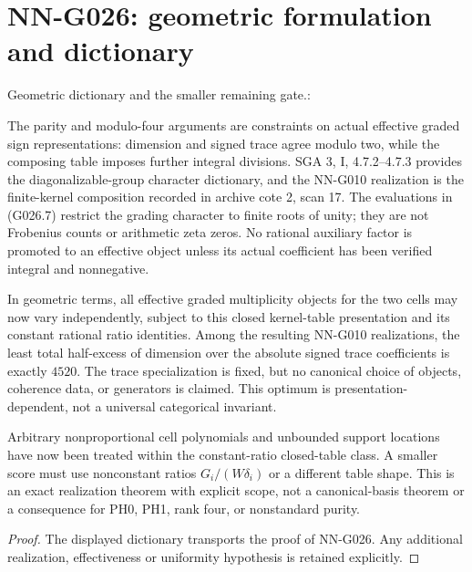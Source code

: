 \section{NN-G026: geometric formulation and dictionary}
\begin{geometricstatement}[NN-G026]
Geometric dictionary and the smaller remaining gate.:

The parity and modulo-four arguments are constraints
on actual effective graded sign representations:
dimension and signed trace agree modulo two, while
the composing table imposes further integral divisions.
SGA 3, I, 4.7.2--4.7.3 provides the diagonalizable-group
character dictionary, and the NN-G010 realization is
the finite-kernel composition recorded in archive
cote 2, scan 17. The evaluations in (G026.7) restrict
the grading character to finite roots of unity;
they are not Frobenius counts or arithmetic zeta zeros.
No rational auxiliary factor is promoted to an
effective object unless its actual coefficient has
been verified integral and nonnegative.

In geometric terms, all effective graded multiplicity objects
for the two cells may now vary independently, subject to this
closed kernel-table presentation and its constant rational
ratio identities. Among the resulting NN-G010 realizations,
the least total half-excess of dimension over the absolute
signed trace coefficients is exactly $4520$. The trace
specialization is fixed, but no canonical choice of objects,
coherence data, or generators is claimed. This optimum is
presentation-dependent, not a universal categorical invariant.

Arbitrary nonproportional cell polynomials and
unbounded support locations have now been treated
within the constant-ratio closed-table class. A
smaller score must use nonconstant ratios
$G_i/(W\delta_i)$ or a different table shape.
This is an exact realization theorem with explicit
scope, not a canonical-basis theorem or a consequence
for PH0, PH1, rank four, or nonstandard purity.


\end{geometricstatement}
\begin{proof} The displayed dictionary transports the proof of NN-G026. Any additional realization, effectiveness or uniformity hypothesis is retained explicitly.\end{proof}


